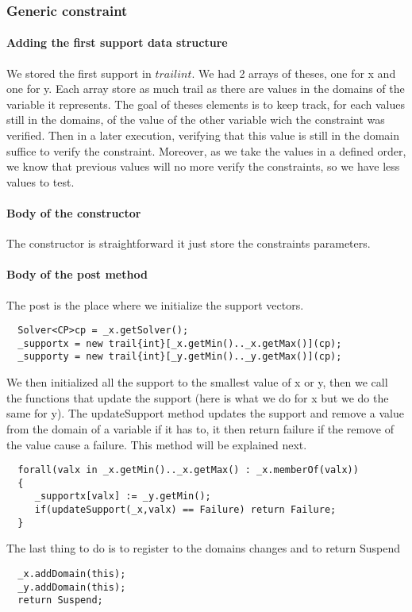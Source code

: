 \documentclass{eplDoc}
\begin{document}
\subsubsection{Generic constraint}

\paragraph{Adding the first support data structure}
We stored the first support in $trail{int}$.  We had 2 arrays of theses, one for x and one for y.  Each array store as much trail as there are values in the domains of the variable it represents.  The goal of theses elements is to keep track, for each values still in the domains, of the value of the other variable wich the constraint was verified.  Then in a later execution, verifying that this value is still in the domain suffice to verify the constraint.
Moreover, as we take the values in a defined order, we know that previous values will no more verify the constraints, so we have less values to test. 
\paragraph{Body of the constructor}
The constructor is straightforward it just store the constraints parameters.

\paragraph{Body of the post method}
The post is the place where we initialize the support vectors.
\begin{lstlisting}
  Solver<CP>cp = _x.getSolver();
  _supportx = new trail{int}[_x.getMin().._x.getMax()](cp);
  _supporty = new trail{int}[_y.getMin().._y.getMax()](cp);
\end{lstlisting}
We then initialized all the support to the smallest value of x or y, then we call the functions that update the support (here is what we do for x but we do the same for y). The updateSupport method updates the support and remove a value from the domain of a variable if it has to, it then return failure if the remove of the value cause a failure.  This method will be explained next.
\begin{lstlisting}
  forall(valx in _x.getMin().._x.getMax() : _x.memberOf(valx))
  {
     _supportx[valx] := _y.getMin();
     if(updateSupport(_x,valx) == Failure) return Failure;
  }
\end{lstlisting}
The last thing to do is to register to the domains changes and to return Suspend
\begin{lstlisting}
  _x.addDomain(this);
  _y.addDomain(this);
  return Suspend;
\end{lstlisting}
\end{document}
